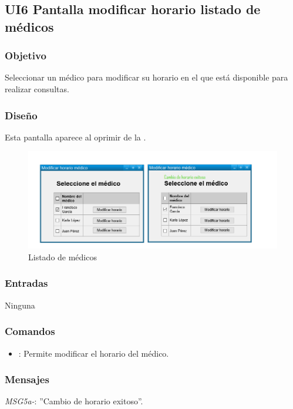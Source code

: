 \subsection{UI6 Pantalla modificar horario listado de médicos}

\subsubsection{Objetivo}
   Seleccionar un médico para modificar su horario en el que está disponible para realizar consultas.

\subsubsection{Diseño}
    Esta pantalla aparece al oprimir  de la .

\begin{figure}[htbp!]
  \centering
    \includegraphics[width=1\textwidth]{images/UI5Gerente2}
    \caption{Listado de médicos}
\end{figure}

\subsubsection{Entradas}
  Ninguna

\subsubsection{Comandos}
\begin{itemize}
    \item {}: Permite modificar el horario del médico.
\end{itemize}

\subsubsection{Mensajes}
{\em MSG5a-}: ''Cambio de horario exitoso''.


